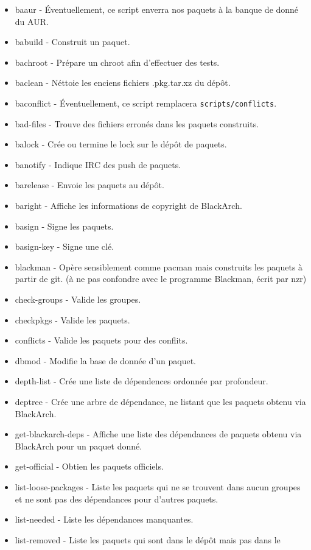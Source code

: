 \documentclass[a4paper, oneside, 11pt]{book}
\begin{document}
\begin{itemize}
\item baaur - Éventuellement, ce script enverra nos paquets à la banque de donné
du AUR.
\item babuild - Construit un paquet.
\item bachroot - Prépare un chroot afin d'effectuer des tests.
\item baclean - Néttoie les enciens fichiers .pkg.tar.xz du dépôt.
\item baconflict - Éventuellement, ce script remplacera \verb|scripts/conflicts|.
\item bad-files - Trouve des fichiers erronés dans les paquets construits.
\item balock - Crée ou termine le lock sur le dépôt de paquets.
\item banotify - Indique IRC des push de paquets.
\item barelease - Envoie les paquets au dépôt.
\item baright - Affiche les informations de copyright de BlackArch.
\item basign - Signe les paquets.
\item basign-key - Signe une clé.
\item blackman - Opère sensiblement comme pacman mais construits les paquets à
partir de git. (à ne pas confondre avec le programme Blackman, écrit par nzr)
\item check-groups - Valide les groupes.
\item checkpkgs - Valide les paquets.
\item conflicts - Valide les paquets pour des conflits.
\item dbmod - Modifie la base de donnée d'un paquet.
\item depth-list - Crée une liste de dépendences ordonnée par profondeur.
\item deptree - Crée une arbre de dépendance, ne listant que les paquets obtenu
via BlackArch.
\item get-blackarch-deps - Affiche une liste des dépendances de paquets obtenu
via BlackArch pour un paquet donné.
\item get-official - Obtien les paquets officiels.
\item list-loose-packages - Liste les paquets qui ne se trouvent dans aucun
groupes et ne sont pas des dépendances pour d'autres paquets.
\item list-needed - Liste les dépendances manquantes.
\item list-removed - Liste les paquets qui sont dans le dépôt mais pas dans le

\end{itemize}
\end{document}
